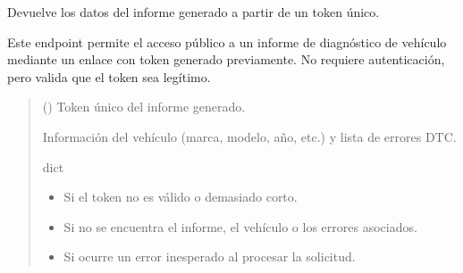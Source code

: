 \documentclass[letterpaper,10pt,spanish]{sphinxmanual}
\begin{document}
\begin{fulllineitems}
\label{\detokenize{modelos:main.ver_informe}}
\pysigstartsignatures
\pysiglinewithargsret
{}
{\sphinxparamcomma {}}
{}
\pysigstopsignatures
\sphinxAtStartPar
Devuelve los datos del informe generado a partir de un token único.

\sphinxAtStartPar
Este endpoint permite el acceso público a un informe de diagnóstico de vehículo mediante un enlace con token generado previamente. No requiere autenticación, pero valida que el token sea legítimo.
\begin{quote}\begin{description}
\sphinxAtStartPar
{} () \textendash{} Token único del informe generado.

\sphinxAtStartPar
Información del vehículo (marca, modelo, año, etc.) y lista de errores DTC.

\sphinxAtStartPar
dict

\begin{itemize}
\item {} 
\sphinxAtStartPar
{} \textendash{} Si el token no es válido o demasiado corto.

\item {} 
\sphinxAtStartPar
{} \textendash{} Si no se encuentra el informe, el vehículo o los errores asociados.

\item {} 
\sphinxAtStartPar
{} \textendash{} Si ocurre un error inesperado al procesar la solicitud.

\end{itemize}

\end{description}\end{quote}

\end{fulllineitems}
\end{document}
